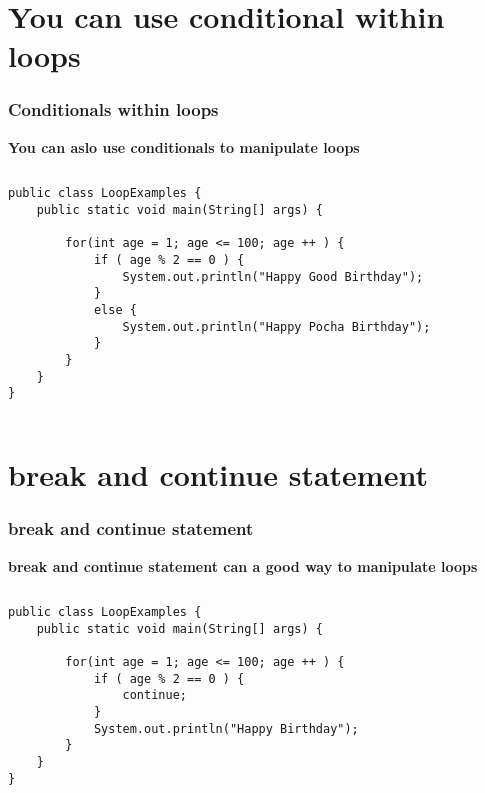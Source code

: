 \documentclass{beamer}
\begin{document}

\section{You can use conditional within loops}

\begin{frame}[fragile]
\frametitle{Conditionals within loops}
\textbf{You can aslo use conditionals to manipulate loops}\\
\begin{columns}[T]
\begin{column}{\textwidth}
\begin{lstlisting}
public class LoopExamples {
    public static void main(String[] args) {

        for(int age = 1; age <= 100; age ++ ) {
            if ( age % 2 == 0 ) {
                System.out.println("Happy Good Birthday");
            }
            else {
                System.out.println("Happy Pocha Birthday");
            }
        }
    }
}
\end{lstlisting}
\end{column}
\end{columns}
\end{frame}




\section{break and continue statement}

\begin{frame}[fragile]
\frametitle{break and continue statement}
\textbf{break and continue statement can a good way to manipulate loops}\\
\begin{columns}[T]
\begin{column}{\textwidth}
\begin{lstlisting}
public class LoopExamples {
    public static void main(String[] args) {

        for(int age = 1; age <= 100; age ++ ) {
            if ( age % 2 == 0 ) {
                continue;
            }
            System.out.println("Happy Birthday");
        }
    }
}
\end{lstlisting}
\end{column}
\end{columns}
\end{frame}
\end{document}
